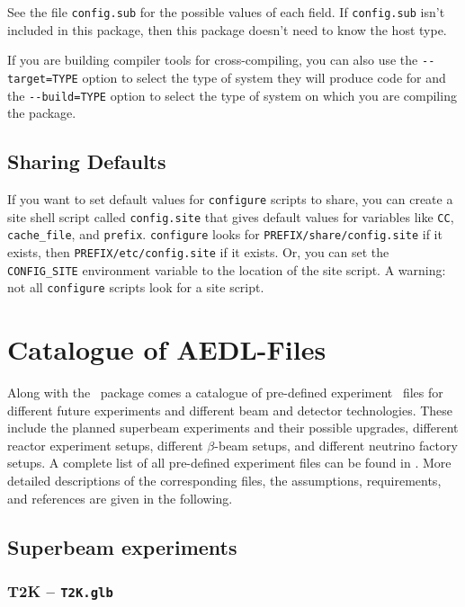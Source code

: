 See the file \verb+config.sub+ for the possible values of each field.  If
\verb+config.sub+ isn't included in this package, then this package doesn't
need to know the host type.

   If you are building compiler tools for cross-compiling, you can also
use the \verb+--target=TYPE+ option to select the type of system they will
produce code for and the \verb+--build=TYPE+ option to select the type of
system on which you are compiling the package.

\section*{Sharing Defaults}

   If you want to set default values for \verb+configure+ scripts to share,
you can create a site shell script called \verb+config.site+ that gives
default values for variables like \verb+CC+, \verb+cache_file+, and \verb+prefix+.
\verb+configure+ looks for \verb+PREFIX/share/config.site+ if it exists, then
\verb+PREFIX/etc/config.site+ if it exists.  Or, you can set the
\verb+CONFIG_SITE+ environment variable to the location of the site script.
A warning: not all \verb+configure+ scripts look for a site script.




\chapter{Catalogue of {\sf AEDL}-Files}
\label{app:aedlfiles}
Along with the \GLOBES\ package comes a catalogue of pre-defined experiment \AEDL\ files for different
future experiments and different beam and detector technologies. These include the planned superbeam experiments
and their possible upgrades, different reactor experiment setups, different $\beta$-beam setups, and different 
neutrino factory setups. A complete list
of all pre-defined experiment files can be found in . More detailed descriptions of the
corresponding files, the assumptions, requirements, and references are given in the following. 
   
\section{Superbeam experiments}
\subsection*{T2K -- {\tt T2K.glb}}

